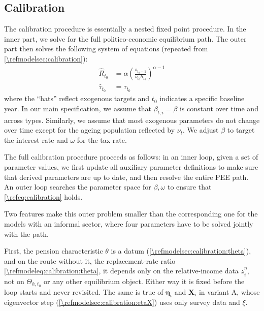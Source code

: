 \subsection{Calibration}\label{\refsec:calibration}
The calibration procedure is essentially a nested fixed point procedure. In the inner part, we solve for the full politico-economic equilibrium path. The outer part then solves the following system of equations (repeated from \cref{\refmodelsec:calibration}):
\begin{subequations}\label{\refeq:calibration}
    \begin{align}
        \hat{R}_{t_0} &= \alpha\left(\frac{s_{t_0-1}}{\nu_{t_0}h_{t_0}}\right)^{\alpha-1} \label{\refeq:calibration:R}\\
        \hat{\tau}_{t_0} &= \tau_{t_0} \label{\refeq:calibration:tau}
    \end{align}
\end{subequations}
where the ``hats'' reflect exogenous targets and $t_0$ indicates a specific baseline year. In our main specification, we assume that $\beta_{t,i} = \beta$ is constant over time and across types. Similarly, we assume that most exogenous parameters do not change over time except for the ageing population reflected by $\nu_t$. We adjust $\beta$ to target the interest rate and $\omega$ for the tax rate.

The full calibration procedure proceeds as follows: in an inner loop, given a set of parameter values, we first update all auxiliary parameter definitions to make sure that derived parameters are up to date, and then resolve the entire PEE path. An outer loop searches the parameter space for $\beta, \omega$ to ensure that \eqref{\refeq:calibration} holds.

Two features make this outer problem smaller than the corresponding one for the models with an informal sector, where four parameters have to be solved jointly with the path.

First, the pension characteristic $\theta$ is a datum (\cref{\refmodelsec:calibration:theta}), and on the route without it, the replacement-rate ratio \eqref{\refmodeleq:calibration:theta}, it depends only on the relative-income data $z_i^{\eta}$, not on $\Theta_{h,t_0}$ or any other equilibrium object. Either way it is fixed before the loop starts and never revisited. The same is true of $\bm{\eta}_i$ and $\bm{X}_i$ in variant A, whose eigenvector step (\cref{\refmodelsec:calibration:etaX}) uses only survey data and $\xi$.


